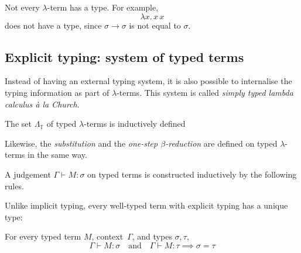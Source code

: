\begin{example}
  Not every $\lambda$-term has a type. For example,
  \[
    \lambda x.\, x\,x
  \]
  does not have a type, since $\sigma \to \sigma$ is not equal to $\sigma$.
\end{example}


\subsection{Explicit typing: system of typed terms}
Instead of having an external typing system, it is also possible to internalise
the typing information as part of $\lambda$-terms. This system is called
\emph{simply typed lambda calculus \textit{\`a la} Church}.
\begin{definition}
  The set $\Lambda_\mathbb{T}$ of typed $\lambda$-terms is inductively defined
  \begin{multicols}{2}
    \begin{prooftree}
    \end{prooftree}
    \begin{prooftree}
    \end{prooftree}
    \begin{prooftree}
    \end{prooftree}
  \end{multicols}
\end{definition}
Likewise, the \emph{substitution} and the \emph{one-step $\beta$-reduction} are
defined on typed $\lambda$-terms in the same way.
\begin{definition}
  A judgement $\Gamma \vdash M : \sigma$ on typed terms is constructed
  inductively by the following rules.
  \begin{multicols}{2} 
  \begin{prooftree}
  \end{prooftree}
  \begin{prooftree}
  \end{prooftree}
  \begin{prooftree}
  \end{prooftree}
  \end{multicols}
\end{definition}
Unlike implicit typing, every well-typed term with explicit typing has 
a unique type:
\begin{proposition}
  For every typed term $M$, context~$\Gamma$, and types $\sigma, \tau$, 
  \[
    \Gamma \vdash M : \sigma
    \quad\text{and}\quad
    \Gamma \vdash M : \tau
    \implies
    \sigma = \tau
  \]
\end{proposition}

